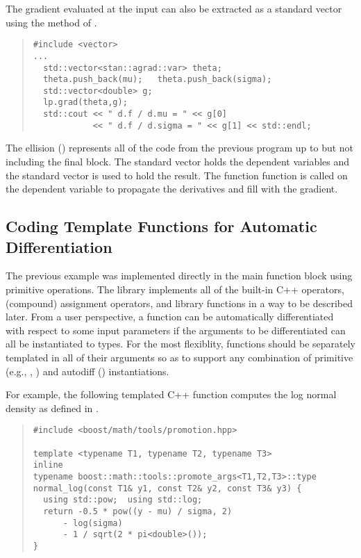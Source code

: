 \documentclass[10pt]{article}
\begin{document}
The gradient evaluated at the input can also be extracted as a
standard vector using the method  of .
%
\begin{quote}
\begin{Verbatim}
#include <vector>
...
  std::vector<stan::agrad::var> theta;
  theta.push_back(mu);   theta.push_back(sigma);
  std::vector<double> g;
  lp.grad(theta,g);
  std::cout << " d.f / d.mu = " << g[0]
            << " d.f / d.sigma = " << g[1] << std::endl;
\end{Verbatim}
\end{quote}
%
The ellision () represents all of the code from the previous
program up to but not including the final block.  The standard vector
 holds the dependent variables and the standard vector
 is used to hold the result.  The function 
function is called on the dependent variable to propagate the
derivatives and fill  with the gradient.

\subsection{Coding Template Functions for Automatic Differentiation}

The previous example was implemented directly in the main function
block using primitive operations.  The  library
implements all of the built-in C++ operators, (compound) assignment
operators, and library functions in a way to be described later.  From
a user perspective, a function can be automatically differentiated
with respect to some input parameters if the arguments to be
differentiated can all be instantiated to  types.
For the most flexiblity, functions should be separately templated in
all of their arguments so as to support any combination of primitive
(e.g., , ) and autodiff ()
instantiations.  

For example, the following templated C++ function computes the log
normal density as defined in .
\begin{quote}
\begin{Verbatim}
#include <boost/math/tools/promotion.hpp>

template <typename T1, typename T2, typename T3>
inline
typename boost::math::tools::promote_args<T1,T2,T3>::type
normal_log(const T1& y1, const T2& y2, const T3& y3) {
  using std::pow;  using std::log;  
  return -0.5 * pow((y - mu) / sigma, 2)
      - log(sigma)
      - 1 / sqrt(2 * pi<double>());
}
\end{Verbatim}
\end{quote}
%
\end{document}
